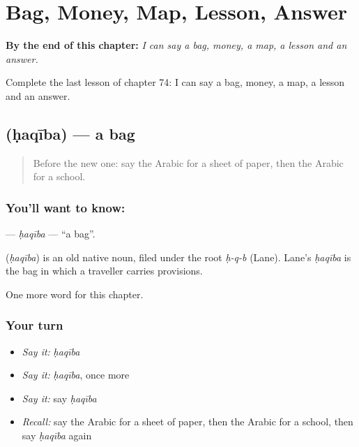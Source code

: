 
\chapter{Bag, Money, Map, Lesson, Answer}
\label{ch:ar-bag-money-map-lesson-answer}

\begin{chapteropening}
\textbf{By the end of this chapter:} \emph{I can say a bag, money, a map, a lesson and an answer.}

Complete the last lesson of chapter 74: I can say a bag, money, a map, a lesson and an answer.
\end{chapteropening}

\section[\texorpdfstring{\ar{حقيبة} (ḥaqība)}{حقيبة (ḥaqība)}]{ (ḥaqība) — a bag}

\label{lesson:AR-C74-haqiba}



\begin{quote}
Before the new one: say the Arabic for a sheet of paper, then the Arabic for a school.
\end{quote}

\subsection*{You'll want to know: }
\textbf{} — \emph{ḥaqība} — \textquotedblleft{}a bag\textquotedblright{}.

\begin{cousinweb}
\textbf{} (\emph{ḥaqība}) is an old native noun, filed under the root \emph{ḥ-q-b} (Lane). Lane's \emph{ḥaqība} is the bag in which a traveller carries provisions.
\end{cousinweb}

\begin{grammarlens}[title={What you've built}]
One more word for this chapter.
\end{grammarlens}

\subsection*{Your turn}
\begin{itemize}
\raggedright
  \item \emph{Say it:} \emph{ḥaqība}
  \item \emph{Say it:} \emph{ḥaqība}, once more
  \item \emph{Say it:} say \emph{ḥaqība}
  \item \emph{Recall:} say the Arabic for a sheet of paper, then the Arabic for a school, then say \emph{ḥaqība} again
\end{itemize}

